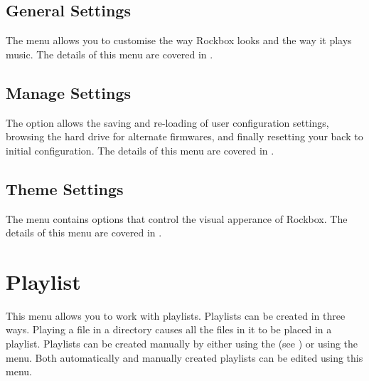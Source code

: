 \subsection{General Settings}
The  menu allows you to customise the way Rockbox looks 
and the way it plays music. The details of this menu are covered in
.

\subsection{Manage Settings}
The  option allows the saving and re-loading of user 
configuration settings, browsing the hard drive for alternate firmwares, and finally
resetting your \dap{} back to initial configuration.
%
%
The details of this menu are covered in
.

\subsection{Theme Settings}
The  menu contains options that control the visual
apperance of Rockbox. The details of this menu are covered in
.



\section{\label{ref:playlistoptions}Playlist}
  This menu allows you to work with playlists. Playlists can be created in 
  three ways. Playing a file in a directory causes all the files in it
  to be placed in a playlist. Playlists can be created manually by
  either using the   (see ) or using
  the  menu. Both automatically and manually created
  playlists can be edited using this menu.

